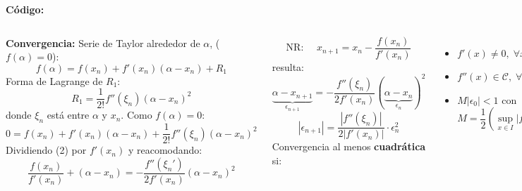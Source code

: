 \documentclass[9pt, aspectratio=169]{beamer}
\begin{document}
\begin{frame}[fragile]
	\begin{columns}[t]
		\textbf{Código:}



	\end{columns}
\end{frame}

\begin{frame}
	\begin{columns}[t]
		\cx
		\textbf{Convergencia:}
		Serie de Taylor alrededor de $\alpha$, ($f(\alpha) = 0$):
		\begin{equation} f(\alpha) = f(x_n) + f'(x_n) (\alpha - x_n) + R_1 \end{equation}
		Forma de Lagrange de $R_1$:
		\begin{equation*}R_1 = \frac{1}{2!} f''(\xi_n) (\alpha- x_n)^2 \end{equation*}
		donde $\xi_n$ está entre $\alpha$ y $x_n$. Como $f(\alpha) = 0$:
		\begin{equation}
			0 = f(x_n) + f'(x_n) (\alpha - x_n) + \frac{1}{2!} f''(\xi_n) (\alpha- x_n)^2
		\end{equation}
		Dividiendo (2) por $f'(x_n)$ y reacomodando:
		\begin{equation}
			\frac{f(x_n)}{f'(x_n)} + (\alpha - x_n) = -\frac{f''(\xi_n')}{2 f'(x_n)} (\alpha - x_n)^2
		\end{equation}

		\begin{equation}
			\text{NR: }\quad    x_{n+1} = x_n -\frac{f(x_n)}{f'(x_n)}
		\end{equation}
		\cx
		resulta:
		\[ \underbrace{\alpha - x_{n+1}}_{\epsilon_{n + 1}} = -\frac{f''(\xi_n)}{2 f'(x_n)} (\underbrace{\alpha - x_n}_{\epsilon_n})^2 \]
		\begin{equation}
			\left| \epsilon_{n + 1} \right| = \frac{|f''(\xi_n)|}{2|f'(x_n)|} \cdot \epsilon_n^2
		\end{equation}
		Convergencia al menos \textbf{cuadrática} si:
		\begin{itemize}
			\item $f'(x) , \; \forall x \in I $
			\item $f''(x) \in {}, \; \forall x \in I$
			\item $M|\epsilon_0| < 1$ con
			      \[ M = \frac{1}{2} \left( \sup_{x \in I} |f''(x)| \right) \left( \sup_{x \in I} \frac{1}{|f'(x)|} \right) \]
		\end{itemize}

		\[ \boxed{ |\epsilon_{n + 1}| \leq M \cdot \epsilon_n^2 } \]


	\end{columns}
\end{frame}
\end{document}
